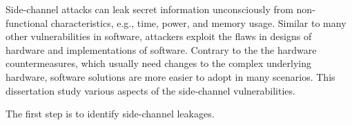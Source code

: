 
\vspace{-0.3in}
Side-channel attacks can leak secret information unconsciously from non-functional characteristics, e.g., time, power, and memory usage. Similar to many other vulnerabilities in software, attackers exploit the flaws in designs of hardware and implementations of software. Contrary to the the hardware countermeasures, which usually need changes to the complex underlying hardware, software solutions are more easier to adopt in many scenarios. This dissertation study various aspects of the side-channel vulnerabilities.

The first step is to identify side-channel leakages. 